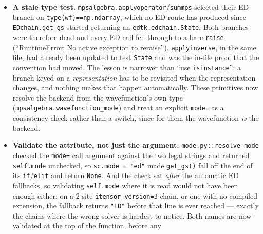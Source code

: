 \documentclass[11pt]{article}
\begin{document}
\begin{itemize}
    --- and every DMRG$\to$ED fallback \texttt{mode.py} makes on its own
    --- was ignored and the call went to DMRG regardless, which on
    \texttt{itensor\_version=3} reached
    \texttt{Chain::kpm\_dynamical\_correlator} with \texttt{have\_H\_}
    false, where ITensor's \texttt{Error()} calls \texttt{abort()}: the
    user's whole process died with \texttt{SIGABRT}, uncatchable from
    Python. The fix was \textbf{deleting} the override rather than
    patching \texttt{get\_mode()} into it --- there was nothing else in
    it, and deletion fixed the \texttt{name="ZZ"} resolution facet in the
    same stroke. An override that reproduces a dispatcher's branches is a
    dispatcher that will drift.
  \item \textbf{A stale type test.}
    \texttt{mpsalgebra.applyoperator}/\texttt{summps} selected their ED
    branch on \texttt{type(wf)==np.ndarray}, which no ED route has
    produced since \texttt{EDchain.get\_gs} started returning an
    \texttt{edtk.edchain.State}. Both branches were therefore dead and
    every ED call fell through to a bare \texttt{raise} (``RuntimeError:
    No active exception to reraise''). \texttt{applyinverse}, in the same
    file, had already been updated to test \texttt{State} and was the
    in-file proof that the convention had moved. The lesson is narrower
    than ``use \texttt{isinstance}'': a branch keyed on a
    \emph{representation} has to be revisited when the representation
    changes, and nothing makes that happen automatically. These
    primitives now resolve the backend from the wavefunction's own type
    (\texttt{mpsalgebra.wavefunction\_mode}) and treat an explicit
    \texttt{mode=} as a consistency check rather than a switch, since for
    them the wavefunction \emph{is} the backend.
  \item \textbf{Validate the attribute, not just the argument.}
    \texttt{mode.py::resolve\_mode} checked the \texttt{mode=} call
    argument against the two legal strings and returned
    \texttt{self.mode} unchecked, so \texttt{sc.mode = "ed"} made
    \texttt{get\_gs()} fall off the end of its \texttt{if}/\texttt{elif}
    and return \texttt{None}. And the check sat \emph{after} the
    automatic ED fallbacks, so validating \texttt{self.mode} where it is
    read would not have been enough either: on a 2-site
    \texttt{itensor\_version=3} chain, or one with no compiled extension,
    the fallback returns \texttt{"ED"} before that line is ever reached
    --- exactly the chains where the wrong solver is hardest to notice.
    Both names are now validated at the top of the function, before any

\end{itemize}
\end{document}
